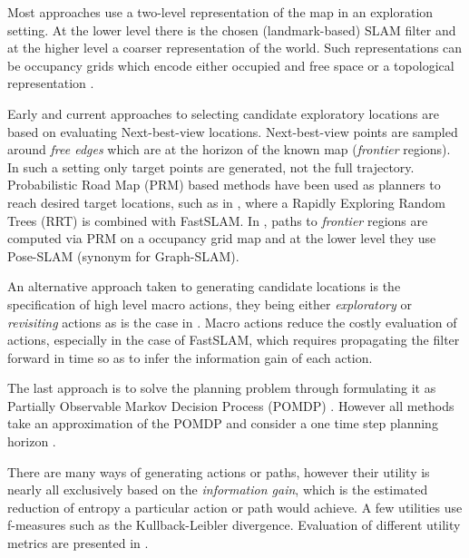 Most approaches use a two-level representation of the map in an exploration setting. At the lower level
there is the chosen (landmark-based) SLAM filter and at the higher level a coarser representation of the world.
Such representations can be occupancy grids \cite{Thrun_grid_based_1996} which encode either occupied and free space
or a topological representation \cite{Kollar_2008_Exploration_SLAM}.

Early and current approaches to selecting candidate exploratory locations are based on evaluating 
Next-best-view \cite{Navigation_strategires_for_exploring_indoor_environments} locations. Next-best-view points are 
sampled around \textit{free edges} which are at the horizon of the known map (\textit{frontier} regions). 
In such a setting only target points are generated, not the full trajectory. Probabilistic Road Map (PRM) \cite{PRM_1996}
based methods have been used as planners to reach desired target locations, such as in \cite{RRT-SLAM}, where a Rapidly
Exploring Random Trees (RRT) is combined with FastSLAM. In \cite{ActivePosSLAM}, paths to \textit{frontier} regions are computed
via PRM  on a occupancy grid map and at the lower level they use Pose-SLAM (synonym for Graph-SLAM).

An alternative approach taken to generating candidate locations is the specification of high level macro actions, they being either 
\textit{exploratory} or \textit{revisiting} actions as is the case in \cite{stachniss05robotics}. Macro actions
reduce the costly evaluation of actions, especially in the case of FastSLAM, which requires propagating the filter 
forward in time so as to infer the information gain of each action.

The last approach is to solve the planning problem through formulating it as  Partially Observable Markov Decision Process (POMDP) \cite{Ross08onlineplanning}. 
However all methods take an approximation of the POMDP and consider a one time step planning horizon \cite[p.37]{GeorgiosLidoris}.

There are many ways of generating actions or paths, however their utility is nearly all exclusively based on the \textit{information gain}, 
which is the estimated reduction of entropy a particular action or path would achieve. A few utilities use f-measures such as the Kullback-Leibler divergence. 
Evaluation of different utility metrics are presented in \cite{Active_SLAM_Uncertainty_compar,tovar_planning,KL_SLAM_exploration_PF}.



